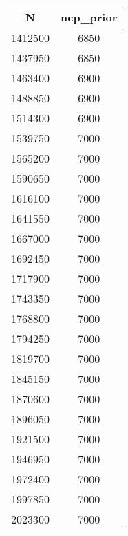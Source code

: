 \documentclass[10pt,a4paper]{report}
\begin{document}
\begin{tabular}{|c|c|}
\hline
N & ncp\_prior \\
\hline
1412500 & 6850 \\
\hline
1437950 & 6850 \\
\hline
1463400 & 6900 \\
\hline
1488850 & 6900 \\
\hline
1514300 & 6900 \\
\hline
1539750 & 7000 \\
\hline
1565200 & 7000 \\
\hline
1590650 & 7000 \\
\hline
1616100 & 7000 \\
\hline
1641550 & 7000 \\
\hline
1667000 & 7000 \\
\hline
1692450 & 7000 \\
\hline
1717900 & 7000 \\
\hline
1743350 & 7000 \\
\hline
1768800 & 7000 \\
\hline
1794250 & 7000 \\
\hline
1819700 & 7000 \\
\hline
1845150 & 7000 \\
\hline
1870600 & 7000 \\
\hline
1896050 & 7000 \\
\hline
1921500 & 7000 \\
\hline
1946950 & 7000 \\
\hline
1972400 & 7000 \\
\hline
1997850 & 7000 \\
\hline
2023300 & 7000 \\
\hline 
\end{tabular}
\quad
\end{document}
